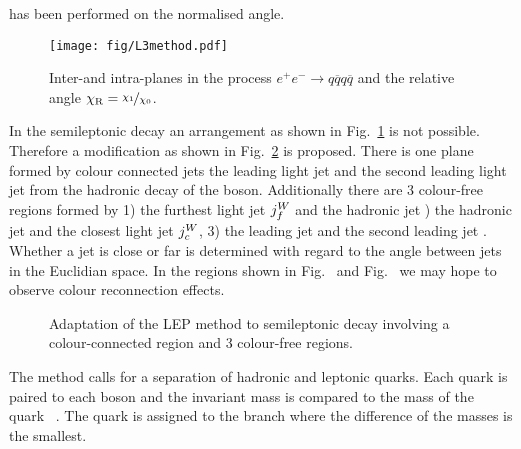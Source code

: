 \noindent has been performed on the normalised angle. 

\begin{figure}[hbtp]
  \centering
  \texttt{[image: fig/L3method.pdf]}
  \caption{Inter-\PW and intra-\PW planes in the process $e^{+}e^{-}\rightarrow q\overline{q}q\overline{q}$ and the relative angle $\chi_{\text{R}}=\nicefrac{\chi_{1}}{\chi_{0}}$.}
  \label{fig:LEP_method}
\end{figure}

In the \ttbar semileptonic decay an arrangement as shown in Fig.~\ref{fig:LEP_method} is not possible. Therefore a modification as shown in Fig.~\ref{fig:LEP_method_adaptation} is proposed. There is one plane formed by colour connected jets \textendash the leading light jet \leadingjet and the second leading light jet \scndleadingjet from the hadronic decay of the \PW boson. Additionally there are 3 colour-free regions formed by 1) the furthest light jet $j^{W}_{f}$ and the hadronic \cPqb jet ) the hadronic \cPqb jet \hadronicb and the closest light jet $j^{W}_{c}$, 3) the leading \cPqb jet \leadingb and the second leading \cPqb jet \scndleadingb. Whether a jet is close or far is determined with regard to the angle between jets in the Euclidian space. In the regions shown in Fig.~ and Fig.~ we may hope to observe colour reconnection effects.

\begin{figure}[hbtp]
  \centering
  \def\twidth{0.24}
  \hfil
 \hfil
  \hfil
  \caption{Adaptation of the LEP method to \ttbar semileptonic decay involving a colour-connected region and 3 colour-free regions.}
  \label{fig:LEP_method_adaptation}
\end{figure}

The method calls for a separation of hadronic and leptonic \cPqb quarks. Each \cPqb quark is paired to each \PW boson and the invariant mass is compared to the mass of the \cPqt quark ~\GeV. The \cPqb quark is assigned to the branch where the difference of the masses is the smallest. 

